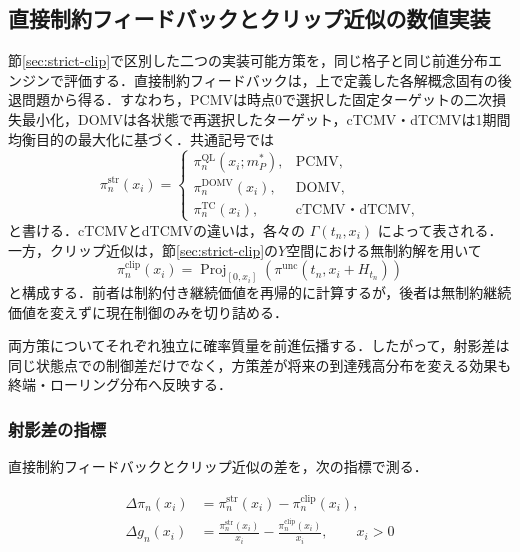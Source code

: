 \documentclass[10pt,a4paper]{article}
\theoremstyle{plain}
\theoremstyle{definition}
\DeclareMathOperator{\Proj}{Proj}
\begin{document}
\subsection{直接制約フィードバックとクリップ近似の数値実装}
\label{sec:projection-gap}

節\ref{sec:strict-clip}で区別した二つの実装可能方策を，同じ格子と同じ前進分布エンジンで評価する．直接制約フィードバックは，上で定義した各解概念固有の後退問題から得る．すなわち，PCMVは時点0で選択した固定ターゲットの二次損失最小化，DOMVは各状態で再選択したターゲット，cTCMV・dTCMVは1期間均衡目的の最大化に基づく．共通記号では
\begin{equation}
  \pi_n^{\mathrm{str}}(x_i)
  =
  \begin{cases}
    \pi_n^{\mathrm{QL}}(x_i;m_P^*), & \text{PCMV},\\
    \pi_n^{\mathrm{DOMV}}(x_i), & \text{DOMV},\\
    \pi_n^{\mathrm{TC}}(x_i), & \text{cTCMV・dTCMV},
  \end{cases}
  \label{eq:pi-str-def}
\end{equation}
と書ける．cTCMVとdTCMVの違いは，各々の $\Gamma(t_n,x_i)$ によって表される．一方，クリップ近似は，節\ref{sec:strict-clip}の$Y$空間における無制約解を用いて
\begin{equation}
  \pi_n^{\mathrm{clip}}(x_i)
  =\Proj_{[0,x_i]}\!\left(\pi^{\mathrm{unc}}(t_n,x_i+H_{t_n})\right)
  \label{eq:pi-clip-def}
\end{equation}
と構成する．前者は制約付き継続価値を再帰的に計算するが，後者は無制約継続価値を変えずに現在制御のみを切り詰める．

両方策についてそれぞれ独立に確率質量を前進伝播する．したがって，射影差は同じ状態点での制御差だけでなく，方策差が将来の到達残高分布を変える効果も終端・ローリング分布へ反映する．

\subsubsection{射影差の指標}

直接制約フィードバックとクリップ近似の差を，次の指標で測る．

\begin{align}
  \Delta\pi_n(x_i)
  &=\pi_n^{\mathrm{str}}(x_i)-\pi_n^{\mathrm{clip}}(x_i),
  \label{eq:delta-pi}\\
  \Delta g_n(x_i)
  &=\frac{\pi_n^{\mathrm{str}}(x_i)}{x_i}
  -\frac{\pi_n^{\mathrm{clip}}(x_i)}{x_i},
  \qquad x_i>0
  \label{eq:delta-g}
\end{align}
\end{document}
